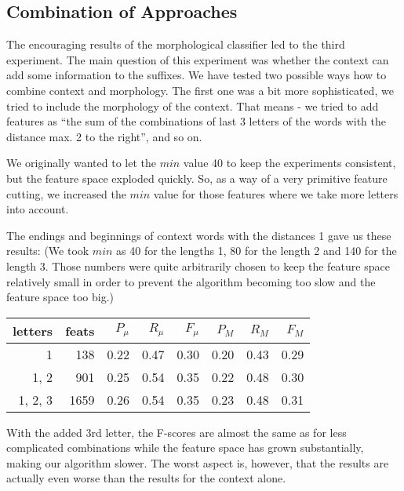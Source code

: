 \documentclass[letterpaper]{article}
\begin{document}
\subsection{Combination of Approaches}
The encouraging results of the morphological classifier led to the third experiment. The main question of this experiment was whether the context can add some information to the suffixes.
We have tested two possible ways how to combine context and morphology. The first one was a bit more sophisticated, we tried to include the morphology of the context. 
That means - we tried to add features as ``the sum of the combinations of last 3 letters of the words with the distance max. 2 to the right'', and so on.

We originally wanted to let the $min$ value 40 to keep the experiments consistent,
but the feature space exploded quickly. So, as a way of a very primitive feature cutting,
we increased the $min$ value for those features where we take more letters into account.

The endings and beginnings of context words with the distances 1 gave us these results:
(We took $min$ as 40 for the lengths 1, 80 for the length 2 and 140 for the length 3. 
Those numbers were quite arbitrarily chosen to keep the feature space relatively small in order to prevent the algorithm becoming too slow and the feature space too big.)


\begin{table}[h]


\begin{tabular}{|r|r|r|r|r|r|r|r|}
\hline
letters&feats & $P_\mu$ & $R_\mu$ & $F_\mu$ & $P_M$ & $R_M$  & $F_M$ \\ \hline
1 & 138 & 0.22 & 0.47 & 0.30 & 0.20 & 0.43 & 0.29 \\ \hline
1, 2  & 901 & 0.25 & 0.54 & 0.35 & 0.22 & 0.48 & 0.30 \\ \hline
1, 2, 3  & 1659 & 0.26 & 0.54 & 0.35 & 0.23 & 0.48 & 0.31 \\ \hline

\end{tabular}
\end{table}

With the added 3rd letter, the F-scores are almost the same as for less complicated combinations while the feature space has grown substantially, making our algorithm slower. The worst aspect is, however, that the results are actually even worse than the results for the context alone.
\end{document}
